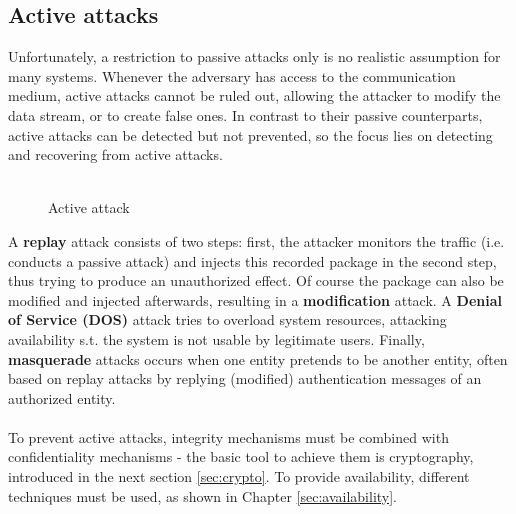 \subsection{Active attacks}
Unfortunately, a restriction to passive attacks only is no realistic assumption for many systems. Whenever the adversary has access to the communication medium, active attacks
cannot be ruled out, allowing the attacker to modify the data stream, or to create false ones. In contrast to their passive counterparts, active attacks can be detected but
not prevented, so the focus lies on detecting and recovering from active attacks.
\\
\\
\begin{figure}[h]
\centering
{}
\label{fig:actAttack}
\caption{Active attack}
\end{figure}
A \textbf{replay} attack consists of two steps: first, the attacker monitors the traffic (i.e. conducts a passive attack) and injects this recorded package in the second step,
thus trying to produce an unauthorized effect.
Of course the package can also be modified and injected afterwards, resulting in a \textbf{modification} attack.
A \textbf{Denial of Service (DOS)} attack tries to overload system resources, attacking availability s.t. the system is not
usable by legitimate users. Finally, \textbf{masquerade} attacks occurs when one entity pretends to be another entity, often based on replay attacks by replying (modified)
authentication messages of an authorized entity.
\\
\\
To prevent active attacks, integrity mechanisms must be combined with confidentiality mechanisms - 
the basic tool to achieve them is cryptography, introduced in the next section \ref{sec:crypto}. To provide availability, different techniques must be used,
as shown in Chapter \ref{sec:availability}.

